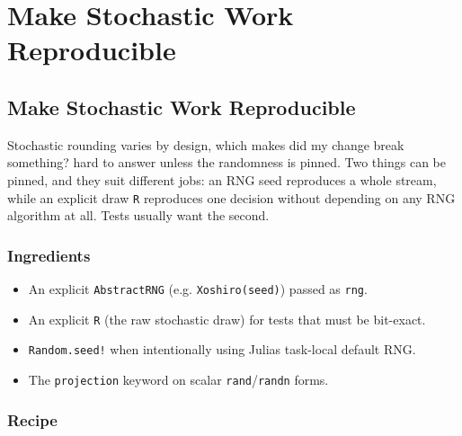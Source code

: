 \chapter{Make Stochastic Work Reproducible}


\section{Make Stochastic Work Reproducible}



\label{2613346512423762910}{}


Stochastic rounding varies by design, which makes {\textquotedbl}did my change break something?{\textquotedbl} hard to answer unless the randomness is pinned. Two things can be pinned, and they suit different jobs: an RNG seed reproduces a whole stream, while an explicit draw \texttt{R} reproduces one decision without depending on any RNG algorithm at all. Tests usually want the second.



\subsection{Ingredients}



\label{13776634711169142479-dup1}{}


\begin{itemize}
\item An explicit \texttt{AbstractRNG} (e.g. \texttt{Xoshiro(seed)}) passed as \texttt{rng}.


\item An explicit \texttt{R} (the raw stochastic draw) for tests that must be bit-exact.


\item \texttt{Random.seed!} when intentionally using Julia{\textquotesingle}s task-local default RNG.


\item The \texttt{projection} keyword on scalar \texttt{rand}/\allowbreak\texttt{randn} forms.

\end{itemize}


\subsection{Recipe}



\label{111379208343275940-dup1}{}


